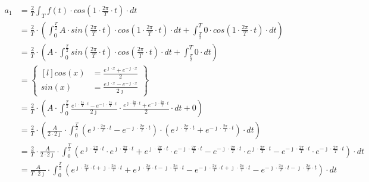 \begin{task}
\begin{align*}
a_1&=\frac{2}{T}\int_{T}f(t) \cdot cos\left( 1 \cdot \frac{2\pi}{T} \cdot t\right) \cdot dt\\
&=\frac{2}{T}\cdot\left(\int_{0}^{\frac{T}{2}}A \cdot sin\left( \frac{2\pi}{T} \cdot t\right) \cdot cos\left( 1 \cdot \frac{2\pi}{T} \cdot t\right) \cdot dt+\int_{\frac{T}{2}}^{T} 0 \cdot cos\left( 1 \cdot \frac{2\pi}{T} \cdot t\right) \cdot dt\right)\\
&=\frac{2}{T}\cdot\left(A \cdot \int_{0}^{\frac{T}{2}}sin\left( \frac{2\pi}{T} \cdot t\right) \cdot cos\left( \frac{2\pi}{T} \cdot t\right) \cdot dt+\int_{\frac{T}{2}}^{T} 0 \cdot dt\right)\\
&=\begin{Bmatrix*}[l]
cos\left(x\right)&=\frac{e^{\jmath \cdot x}+e^{-\jmath \cdot x}}{2}\\
sin\left(x\right)&=\frac{e^{\jmath \cdot x}-e^{-\jmath \cdot x}}{2 \jmath }
\end{Bmatrix*}\\
&=\frac{2}{T}\cdot\left(A \cdot \int_{0}^{\frac{T}{2}} \frac{e^{\jmath \cdot \frac{2\pi}{T} \cdot t}-e^{-\jmath \cdot \frac{2\pi}{T} \cdot t}}{2\jmath} \cdot \frac{e^{\jmath \cdot \frac{2\pi}{T} \cdot t}+e^{-\jmath \cdot \frac{2\pi}{T} \cdot t}}{2} \cdot dt+0\right)\\
&=\frac{2}{T}\cdot\left(\frac{A}{2\cdot 2\jmath} \cdot \int_{0}^{\frac{T}{2}} \left(e^{\jmath \cdot \frac{2\pi}{T} \cdot t}-e^{-\jmath \cdot \frac{2\pi}{T} \cdot t}\right)\cdot \left(e^{\jmath \cdot \frac{2\pi}{T} \cdot t}+e^{-\jmath \cdot \frac{2\pi}{T} \cdot t}\right) \cdot dt\right)\\
&=\frac{2}{T} \cdot \frac{A}{2\cdot 2\jmath} \cdot \int_{0}^{\frac{T}{2}}
\left(e^{\jmath \cdot \frac{2\pi}{T} \cdot t} \cdot e^{\jmath \cdot \frac{2\pi}{T} \cdot t} + e^{\jmath \cdot \frac{2\pi}{T} \cdot t} \cdot e^{-\jmath \cdot \frac{2\pi}{T} \cdot t} - e^{-\jmath \cdot \frac{2\pi}{T} \cdot t} \cdot e^{\jmath \cdot \frac{2\pi}{T} \cdot t} - e^{-\jmath \cdot \frac{2\pi}{T} \cdot t} \cdot e^{-\jmath \cdot \frac{2\pi}{T} \cdot t} \right) \cdot dt\\
&=\frac{A}{T\cdot 2\jmath} \cdot \int_{0}^{\frac{T}{2}}
\left(e^{\jmath \cdot \frac{2\pi}{T} \cdot t + \jmath \cdot \frac{2\pi}{T} \cdot t} + e^{\jmath \cdot \frac{2\pi}{T} \cdot t -\jmath \cdot \frac{2\pi}{T} \cdot t} - e^{-\jmath \cdot \frac{2\pi}{T} \cdot t+ \jmath \cdot \frac{2\pi}{T} \cdot t} - e^{-\jmath \cdot \frac{2\pi}{T} \cdot t -\jmath \cdot \frac{2\pi}{T} \cdot t} \right) \cdot dt\\

\end{align*}
\end{task}
